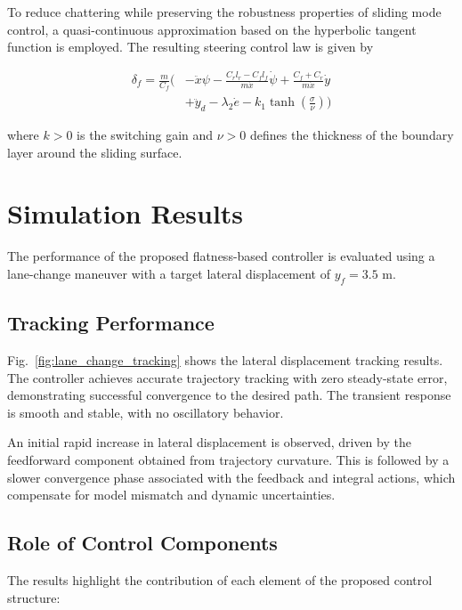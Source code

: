 \documentclass[letterpaper]{ifacconf}
\begin{document}
To reduce chattering while preserving the robustness properties of sliding mode control, a quasi-continuous approximation based on the hyperbolic tangent function is employed. The resulting steering control law is given by

\begin{equation}
\boxed{
\begin{aligned}
\delta_f=\frac{m}{C_f}\Bigg(&-\ddot{x}\psi-\frac{C_r l_r-C_f l_f}{m\dot{x}}\dot{\psi}+\frac{C_f+C_r}{m\dot{x}}\dot{y}\\
&+\ddot{y}_d-\lambda_2\dot{e}-k_1\tanh\left(\frac{\sigma}{\nu}\right)\Bigg)
\end{aligned}
}
\end{equation}

where $k>0$ is the switching gain and $\nu>0$ defines the thickness of the boundary layer around the sliding surface.
\section{Simulation Results}

The performance of the proposed flatness-based controller is evaluated using a lane-change maneuver with a target lateral displacement of $y_f = 3.5$ m.

\subsection{Tracking Performance}

Fig.~\ref{fig:lane_change_tracking} shows the lateral displacement tracking results. The controller achieves accurate trajectory tracking with zero steady-state error, demonstrating successful convergence to the desired path. The transient response is smooth and stable, with no oscillatory behavior.

An initial rapid increase in lateral displacement is observed, driven by the feedforward component obtained from trajectory curvature. This is followed by a slower convergence phase associated with the feedback and integral actions, which compensate for model mismatch and dynamic uncertainties.

\subsection{Role of Control Components}

The results highlight the contribution of each element of the proposed control structure:
\end{document}
